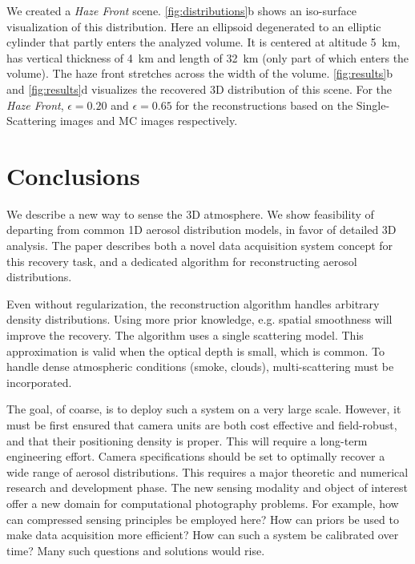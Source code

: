 \documentclass[10pt,letterpaper]{article}
\begin{document}
We created a {\em Haze Front} scene. \cref{fig:distributions}b shows
an iso-surface visualization of this distribution.
Here an ellipsoid degenerated to an elliptic cylinder that partly
enters the analyzed volume. It is centered at altitude \SI{5}{\km},
has vertical thickness of \SI{4}{\km} and length of \SI{32}{\km} (only
part of which enters the volume). The haze front stretches across the
width of the volume.  \cref{fig:results}b and \cref{fig:results}d
visualizes the recovered 3D distribution of this scene. For the {\em
  Haze Front}, $\epsilon=0.20$ and $\epsilon=0.65$ for the
reconstructions based on the Single-Scattering images and MC images
respectively.


\section{Conclusions}
\label{sec:conclusions}

We describe a new way to sense the 3D atmosphere. We show feasibility
of departing from common 1D aerosol distribution models, in favor of
detailed 3D analysis.  The paper describes both a novel data
acquisition system concept for this recovery task, and a dedicated
algorithm for reconstructing aerosol distributions.

Even without regularization, the reconstruction algorithm handles
arbitrary density distributions. Using more prior knowledge,
e.g. spatial smoothness will improve the recovery.  The algorithm uses
a single scattering model. This approximation is valid when the
optical depth is small, which is common. To handle dense atmospheric
conditions (smoke, clouds), multi-scattering must be incorporated.

The goal, of coarse, is to deploy such a system on a very large
scale. However, it must be first ensured that camera units are both
cost effective and field-robust, and that their positioning density is
proper. This will require a long-term engineering effort. Camera
specifications should be set to optimally recover a wide range of
aerosol distributions. This requires a major theoretic and numerical
research and development phase.  The new sensing modality and object
of interest offer a new domain for computational photography
problems. For example, how can compressed sensing principles be
employed here? How can priors be used to make data acquisition more
efficient? How can such a system be calibrated over time? Many such
questions and solutions would rise.
\end{document}
